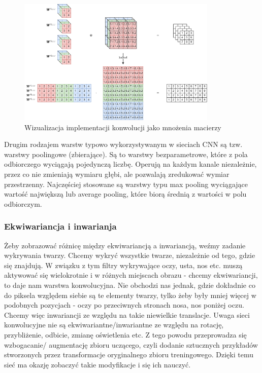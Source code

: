 \documentclass{myclass}
\numberwithin{equation}{subsection}
\begin{document}
\begin{figure}[ht]
\centering
\includegraphics[width=0.85\textwidth]{figs/conv.png}
\caption{Wizualizacja implementacji konwolucji jako mnożenia macierzy}
\label{fig:conv}
\end{figure}

Drugim rodzajem warstw typowo wykorzystywanym w sieciach CNN są tzw. warstwy poolingowe
(zbierające). Są to warstwy bezparametrowe, które z pola odbiorczego wyciągają pojedynczą liczbę.
Operują na każdym kanale niezależnie, przez co nie zmieniają wymiaru głębi, ale pozwalają zredukować
wymiar przestrzenny. Najczęściej stosowane są warstwy typu max pooling wyciągające wartość
największą lub average pooling, które biorą średnią z wartości w polu odbiorczym.

\subsubsection{Ekwiwariancja i inwarianja}

Żeby zobrazować różnicę między ekwiwariancją a inwariancją, weźmy zadanie wykrywania twarzy. Chcemy
wykryć wszystkie twarze, niezależnie od tego, gdzie się znajdują. W związku z tym filtry wykrywające
oczy, usta, nos etc. muszą aktywować się wielokrotnie i w różnych miejscach obrazu - chcemy
ekwiwariancji, to daje nam warstwa konwolucyjna. Nie obchodzi nas jednak, gdzie dokładnie co do
piksela względem siebie są te elementy twarzy, tylko żeby były mniej więcej w podobnych pozycjach -
oczy po przeciwnych stronach nosa, nos poniżej oczu. Chcemy więc inwariancji ze względu na takie
niewielkie translacje. Uwaga sieci konwolucyjne nie są ekwiwariantne/inwariantne ze względu na
rotację, przybliżenie, odbicie, zmianę oświetlenia etc. Z tego powodu przeprowadza się wzbogacanie/
augmentację zbioru uczącego, czyli dodanie sztucznych przykładów stworzonych przez transformacje
oryginalnego zbioru treningowego. Dzięki temu sieć ma okazję zobaczyć takie modyfikacje i się ich
nauczyć.
\end{document}
